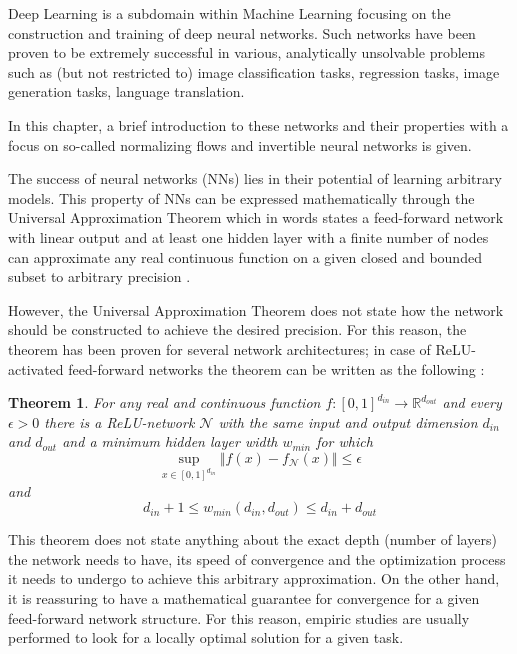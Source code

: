 \label{ch:deeplearning}

Deep Learning is a subdomain within Machine Learning focusing on the construction and training of deep neural networks. Such networks have been proven to be extremely successful in various, analytically unsolvable problems such as (but not restricted to) image classification tasks, regression tasks, image generation tasks, language translation.

In this chapter, a brief introduction to these networks and their properties with a focus on so-called normalizing flows and invertible neural networks is given.


The success of neural networks (NNs) lies in their potential of learning arbitrary models. This property of NNs can be expressed mathematically through the Universal Approximation Theorem which in words states a feed-forward network with linear output and at least one hidden layer with a finite number of nodes can approximate any real continuous function on a given closed and bounded subset to arbitrary precision \cite{DLiPR}.

However, the Universal Approximation Theorem does not state how the network should be constructed to achieve the desired precision. For this reason, the theorem has been proven for several network architectures; in case of ReLU-activated feed-forward networks the theorem can be written as the following \cite{UAC}:
\newtheorem{theorem}{Theorem}
\begin{theorem}
	For any real and continuous function $f : [0, 1]^{d_{in}} \rightarrow \mathbb{R}^{d_{out}}$ and every $\epsilon>0$ there is a ReLU-network $\mathcal{N}$ with the same input and output dimension $d_{in}$ and $d_{out}$ and a minimum hidden layer width $w_{min}$ for which
	\begin{equation*}
		\sup_{x\in[0, 1]^{d_{in}}}\Vert f(x)-f_\mathcal{N}(x)\Vert \leq \epsilon
	\end{equation*}
	and
	\begin{equation*}
		d_{in} + 1 \leq w_{min}(d_{in}, d_{out}) \leq d_{in} + d_{out}
	\end{equation*}
\end{theorem}
This theorem does not state anything about the exact depth (number of layers) the network needs to have, its speed of convergence and the optimization process it needs to undergo to achieve this arbitrary approximation. On the other hand, it is reassuring to have a mathematical guarantee for convergence for a given feed-forward network structure. For this reason, empiric studies are usually performed to look for a locally optimal solution for a given task.


